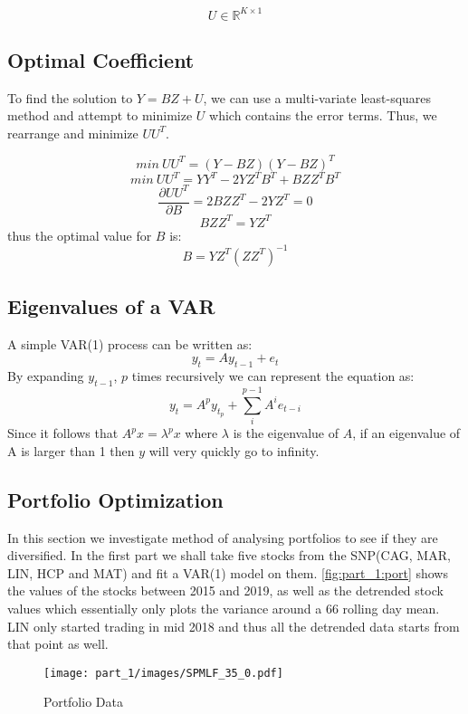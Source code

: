 \[U \in \mathbb{R}^{K\times 1}\]


\subsection{Optimal Coefficient}
\label{part_1:optimise}

To find the solution to $Y = BZ + U$, we can use a multi-variate least-squares method and attempt to minimize $U$ which contains the error terms. Thus, we rearrange and minimize $UU^T$.
  
\[min\:UU^T = (Y-BZ)(Y-BZ)^T\]  
\[min\:UU^T = YY^T - 2YZ^TB^T + BZZ^TB^T\]   
\[\frac{\partial UU^T}{\partial B} = 2BZZ^T - 2YZ^T = 0\]   
\[ BZZ^T = YZ^T \]   
thus the optimal value for $B$ is:  
\[B = YZ^T(ZZ^T)^{-1}\]  

\subsection{Eigenvalues of a VAR}

A simple VAR(1) process can be written as:  
\[y_t = Ay_{t-1} + e_t\]
By expanding $y_{t-1}$, $p$ times recursively we can represent the equation as:  
\[y_t = A^py_{t_p} + \sum_i^{p-1}A^ie_{t-i}\]
Since it follows that $A^px = \lambda^px$ where $\lambda$ is the eigenvalue of $A$, if an eigenvalue of A is larger than 1 then $y$ will very quickly go to infinity.

\subsection{Portfolio Optimization}

In this section we investigate method of analysing portfolios to see if they are diversified. In the first part we shall take five stocks from the SNP(CAG, MAR, LIN, HCP and MAT) and fit a VAR(1) model on them. \autoref{fig:part_1:port} shows the values of the stocks between 2015 and 2019, as well as the detrended stock values which essentially only plots the variance around a 66 rolling day mean. LIN only started trading in mid 2018 and thus all the detrended data starts from that point as well.

\begin{figure}[!htb]
    \centering
    \texttt{[image: part\_1/images/SPMLF\_35\_0.pdf]}
    \caption{Portfolio Data}
    \label{fig:part_1:port}
\end{figure}


